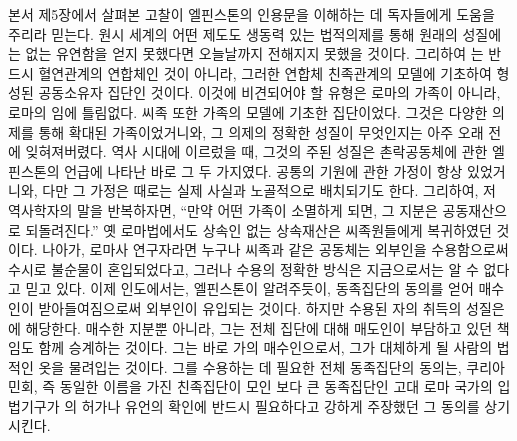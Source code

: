 본서 제5장에서 살펴본 고찰이 엘핀스톤의 인용문을 이해하는 데
독자들에게 도움을 주리라 믿는다.
원시 세계의 어떤 제도도
생동력 있는 법적의제를 통해
원래의 성질에는 없는 유연함을
얻지 못했다면
오늘날까지 전해지지 못했을 것이다.
그리하여 는 반드시 혈연관계의 연합체인 것이 아니라,
그러한 연합체 친족관계의 모델에 기초하여 형성된
공동소유자 집단인 것이다.
이것에 비견되어야 할 유형은 로마의 가족이 아니라,
로마의 임에 틀림없다.
씨족 또한 가족의 모델에 기초한 집단이었다.
그것은 다양한 의제를 통해 확대된 가족이었거니와,
그 의제의 정확한 성질이 무엇인지는 아주 오래 전에 잊혀져버렸다.
역사 시대에 이르렀을 때, 그것의 주된 성질은
촌락공동체에 관한 엘핀스톤의 언급에 나타난 바로 그 두 가지였다.
공통의 기원에 관한 가정이 항상 있었거니와,
다만 그 가정은 때로는 실제 사실과 노골적으로 배치되기도 한다.
그리하여, 저 역사학자의 말을 반복하자면,
``만약 어떤 가족이 소멸하게 되면, 그 지분은 공동재산으로 되돌려진다.''
옛 로마법에서도 상속인 없는 상속재산은
씨족원들에게 복귀하였던 것이다.
나아가, 로마사 연구자라면 누구나
씨족과 같은 공동체는 외부인을 수용함으로써 수시로 불순물이 혼입되었다고,
그러나 수용의 정확한 방식은 지금으로서는 알 수 없다고 믿고 있다.
이제 인도에서는, 엘핀스톤이 알려주듯이,
동족집단의 동의를 얻어 매수인이 받아들여짐으로써
외부인이 유입되는 것이다.
하지만 수용된 자의 취득의 성질은
에 해당한다.
매수한 지분뿐 아니라,
그는
전체 집단에 대해 매도인이 부담하고 있던 책임도
함께
승계하는 것이다.
%
그는 바로 가의 매수인으로서,
그가 대체하게 될 사람의 법적인 옷\hanja{[衣服]}을 물려입는 것이다.
그를 수용하는 데 필요한 전체 동족집단의 동의는,
쿠리아 민회, 즉
동일한 이름을 가진 친족집단이 모인 보다 큰 동족집단인 고대 로마 국가의
입법기구가
의 허가나 유언의 확인에 반드시 필요하다고 강하게 주장했던
그 동의를 상기시킨다.


